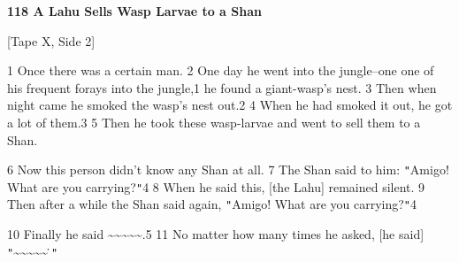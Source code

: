
\textbf{118 A Lahu Sells Wasp Larvae to a Shan }

[Tape X, Side 2]

1 Once there was a certain man. 2 One day he went into the jungle--one one of his
frequent forays into the jungle,1 he found a giant-wasp's nest. 3 Then when night
came he smoked the wasp's nest out.2 4 When he had smoked it out, he got a lot
of them.3 5 Then he took these wasp-larvae and went to sell them to a Shan.

6 Now this person didn't know any Shan at all. 7 The Shan said to him: \texttt{"}Amigo!
What are you carrying?\texttt{"}4 8 When he said this, [the Lahu] remained silent.
9 Then after a while the Shan said again, \texttt{"}Amigo! What are you carrying?\texttt{"}4

10 Finally he said \textasciitilde{}\textasciitilde{}\textasciitilde{}\textasciitilde{}\textasciitilde{}.5
11 No matter how many times he asked, [he said] \texttt{"}\textasciitilde{}\textasciitilde{}\textasciitilde{}\textasciitilde{}\textasciitilde{}\.\texttt{"}

